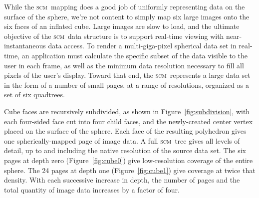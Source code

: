 \documentclass[oneside,10pt]{memoir}
\newcommand{\scm}     {\textsc{scm}}
\begin{document}
\begin{Spacing}{1.1}
While the \scm\ mapping does a good job of uniformly representing data on the surface of the sphere, we're not content to simply map six large images onto the six faces of an inflated cube. Large images are slow to load, and the ultimate objective of the \scm\ data structure is to support real-time viewing with near-instantaneous data access. To render a multi-giga-pixel spherical data set in real-time, an application must calculate the specific subset of the data visible to the user in each frame, as well as the minimum data resolution necessary to fill all pixels of the user's display. Toward that end, the \scm\ represents a large data set in the form of a number of small pages, at a range of resolutions, organized as a set of six quadtrees.

Cube faces are recursively subdivided, as shown in Figure~\ref{fig:subdivision}, with each four-sided face cut into four child faces, and the newly-created center vertex placed on the surface of the sphere. Each face of the resulting polyhedron gives one spherically-mapped page of image data. A full \scm\ tree gives all levels of detail, up to and including the native resolution of the source data set. The six pages at depth zero (Figure~\ref{fig:cube0}) give low-resolution coverage of the entire sphere. The 24 pages at depth one (Figure~\ref{fig:cube1}) give coverage at twice that density. With each successive increase in depth, the number of pages and the total quantity of image data increases by a factor of four.


\end{Spacing}
\end{document}
